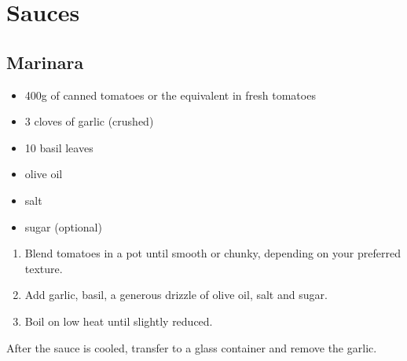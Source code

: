 \chapter{Sauces}
\section{Marinara} \label{sauce-marinara}

\begin{itemize}
  \item 400g of canned tomatoes or the equivalent in fresh tomatoes
  \item 3 cloves of garlic (crushed)
  \item 10 basil leaves
  \item olive oil
  \item salt
  \item sugar (optional)
\end{itemize}

\begin{enumerate}
  \item Blend tomatoes in a pot until smooth or chunky, depending on your
    preferred texture.
  \item Add garlic, basil, a generous drizzle of olive oil, salt and sugar.
  \item Boil on low heat until slightly reduced.
\end{enumerate}

After the sauce is cooled, transfer to a glass container and remove the garlic.
